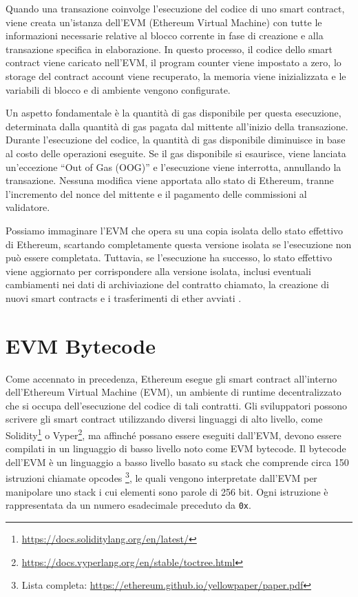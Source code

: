 Quando una transazione coinvolge l’esecuzione del codice di uno smart contract, viene creata un’istanza dell’EVM (Ethereum Virtual Machine) con tutte le 
informazioni necessarie relative al blocco corrente in fase di creazione e alla transazione specifica in elaborazione. In questo processo, il codice dello 
smart contract viene caricato nell’EVM, il program counter viene impostato a zero, lo storage del contract account viene recuperato, la memoria viene 
inizializzata e le variabili di blocco e di ambiente vengono configurate.

Un aspetto fondamentale è la quantità di gas disponibile per questa esecuzione, determinata dalla quantità di gas pagata dal mittente all’inizio della transazione. 
Durante l’esecuzione del codice, la quantità di gas disponibile diminuisce in base al costo delle operazioni eseguite. Se il gas disponibile si esaurisce, viene 
lanciata un’eccezione “Out of Gas (OOG)” e l’esecuzione viene interrotta, annullando la transazione. Nessuna modifica viene apportata allo stato di Ethereum, 
tranne l’incremento del nonce del mittente e il pagamento delle commissioni al validatore.

Possiamo immaginare l’EVM che opera su una copia isolata dello stato effettivo di Ethereum, scartando completamente questa versione isolata se l’esecuzione non 
può essere completata. Tuttavia, se l’esecuzione ha successo, lo stato effettivo viene aggiornato per corrispondere alla versione isolata, inclusi eventuali 
cambiamenti nei dati di archiviazione del contratto chiamato, la creazione di nuovi smart contracts e i trasferimenti di ether avviati \cite{antonopoulos2018mastering}.


\newpage
\section{EVM Bytecode}\label{sec:bytecode}
Come accennato in precedenza, Ethereum esegue gli smart contract all’interno dell’Ethereum Virtual Machine (EVM), un ambiente di runtime decentralizzato che si occupa 
dell’esecuzione del codice di tali contratti. Gli sviluppatori possono scrivere gli smart contract utilizzando diversi linguaggi di alto livello, come 
Solidity\footnote{\url{https://docs.soliditylang.org/en/latest/}} o Vyper\footnote{\url{ https://docs.vyperlang.org/en/stable/toctree.html}}, ma affinché possano essere 
eseguiti dall’EVM, devono essere compilati in un linguaggio di basso livello noto come EVM bytecode. Il bytecode dell’EVM è un linguaggio a basso livello basato su 
stack che comprende circa 150 istruzioni chiamate opcodes \footnote{Lista completa: \url{https://ethereum.github.io/yellowpaper/paper.pdf}}, le quali vengono 
interpretate dall’EVM per manipolare uno stack i cui elementi sono parole di 256 bit. Ogni istruzione è rappresentata da un numero esadecimale preceduto da {\tt 0x}.

